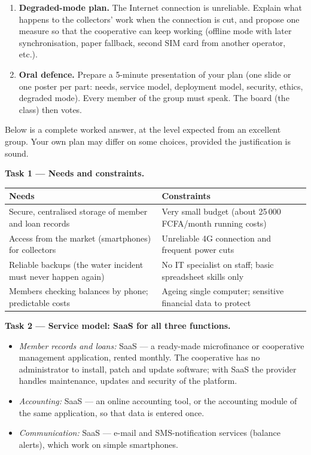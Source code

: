 \documentclass[11pt]{article}
\newcommand{\cle}[1]{{\popxbold\color{popdark}#1}}
\newcounter{popsec}
\newcounter{popsub}
\newcommand{\courssub}[1]{%
  \stepcounter{popsub}%
  \par\vspace{9pt}\noindent{\popxbold\fontsize{11.5}{13}\selectfont\color{popink}{\color{poporange}\thepopsec.\thepopsub}\hspace{6pt}#1}\par\nopagebreak\vspace{4pt}
}
\begin{document}
\begin{enumerate}
\item \textbf{Degraded-mode plan.} The Internet connection is unreliable. Explain what happens to the collectors' work when the connection is cut, and propose one measure so that the cooperative can keep working (offline mode with later synchronisation, paper fallback, second SIM card from another operator, etc.).

\item \textbf{Oral defence.} Prepare a 5-minute presentation of your plan (one slide or one poster per part: needs, service model, deployment model, security, ethics, degraded mode). Every member of the group must speak. The board (the class) then votes.
\end{enumerate}

\courssub{Model answer}

Below is a complete worked answer, at the level expected from an excellent group. Your own plan may differ on some choices, provided the justification is sound.

\textbf{Task 1 --- Needs and constraints.}

\begin{center}
\begin{tabularx}{\linewidth}{|X|X|}
\hline
\rowcolor{popblueL} \textbf{Needs} & \textbf{Constraints} \\
\hline
Secure, centralised storage of member and loan records & Very small budget (about 25\,000 FCFA/month running costs) \\
\hline
Access from the market (smartphones) for collectors & Unreliable 4G connection and frequent power cuts \\
\hline
Reliable backups (the water incident must never happen again) & No IT specialist on staff; basic spreadsheet skills only \\
\hline
Members checking balances by phone; predictable costs & Ageing single computer; sensitive financial data to protect \\
\hline
\end{tabularx}
\end{center}

\textbf{Task 2 --- Service model: SaaS for all three functions.}

\begin{itemize}
\item \emph{Member records and loans:} \cle{SaaS} --- a ready-made microfinance or cooperative management application, rented monthly. The cooperative has no administrator to install, patch and update software; with SaaS the provider handles maintenance, updates and security of the platform.
\item \emph{Accounting:} \cle{SaaS} --- an online accounting tool, or the accounting module of the same application, so that data is entered once.
\item \emph{Communication:} \cle{SaaS} --- e-mail and SMS-notification services (balance alerts), which work on simple smartphones.
\end{itemize}
\end{document}
